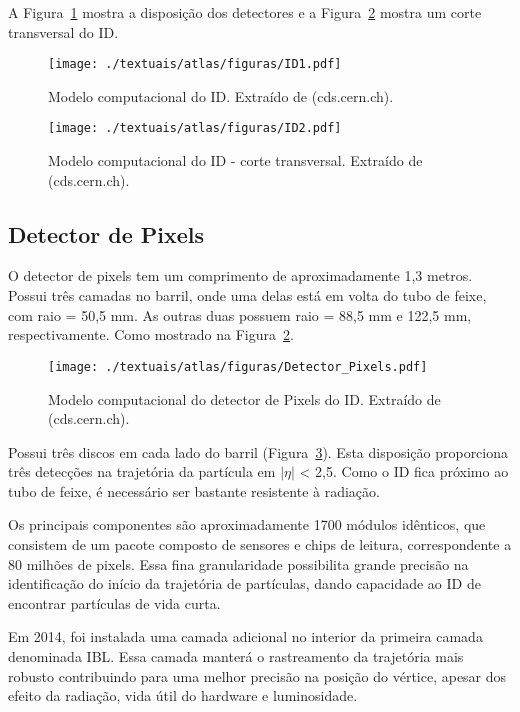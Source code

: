 A Figura~\ref{fig:3T05} mostra a disposição dos detectores e a Figura~\ref{fig:3T06} mostra um corte transversal do ID.

\begin{figure}[h!]
	\centering
	\texttt{[image: ./textuais/atlas/figuras/ID1.pdf]}\\
	\caption{Modelo computacional do ID. Extraído de (cds.cern.ch).}
	\label{fig:3T05}
\end{figure}

\begin{figure}[h!]
	\centering
	\texttt{[image: ./textuais/atlas/figuras/ID2.pdf]}\\
	\caption{Modelo computacional do ID - corte transversal. Extraído de (cds.cern.ch).}
	\label{fig:3T06}
\end{figure}

\subsection{Detector de Pixels}

O detector de pixels \cite{aad2008atlas2} tem um comprimento de aproximadamente 1,3 metros. Possui três camadas no barril, onde uma delas está em volta do tubo de feixe, com raio = 50,5 mm. As outras duas possuem raio = 88,5 mm e 122,5 mm, respectivamente. Como mostrado na Figura~\ref{fig:3T06}.

\begin{figure}[h!]
	\centering
	\texttt{[image: ./textuais/atlas/figuras/Detector\_Pixels.pdf]}\\
	\caption{Modelo computacional do detector de Pixels do ID. Extraído de (cds.cern.ch).}
	\label{fig:3T04}
\end{figure}

Possui três discos em cada lado do barril (Figura~\ref{fig:3T04}).  Esta disposição proporciona três detecções na trajetória da partícula em $|\eta|$ < 2,5. Como o ID fica próximo ao tubo de feixe, é necessário ser bastante resistente à radiação.

Os principais componentes são aproximadamente 1700 módulos idênticos, que consistem de um pacote composto de sensores e chips de leitura, correspondente a 80 milhões de pixels. Essa fina granularidade possibilita grande precisão na identificação do início da trajetória de partículas, dando capacidade ao ID de encontrar partículas de vida curta.

Em 2014, foi instalada uma camada adicional no interior da primeira camada  denominada \ac{IBL}. Essa camada manterá o rastreamento da trajetória mais robusto contribuindo para uma melhor precisão na posição do vértice, apesar dos efeito da radiação, vida útil do hardware e luminosidade.


